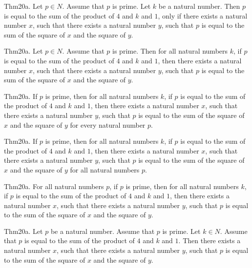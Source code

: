 \documentclass{article}
\begin{document}
Thm20a. Let $p \in N$. Assume that $p$ is prime. Let $k$ be a natural number. Then $p$ is equal to the sum of the product of $4$ and $k$ and $1$, only if there exists a natural number $x$, such that there exists a natural number $y$, such that $p$ is equal to the sum of the square of $x$ and the square of $y$.

Thm20a. Let $p \in N$. Assume that $p$ is prime. Then for all natural numbers $k$, if $p$ is equal to the sum of the product of $4$ and $k$ and $1$, then there exists a natural number $x$, such that there exists a natural number $y$, such that $p$ is equal to the sum of the square of $x$ and the square of $y$.

Thm20a. If $p$ is prime, then for all natural numbers $k$, if $p$ is equal to the sum of the product of $4$ and $k$ and $1$, then there exists a natural number $x$, such that there exists a natural number $y$, such that $p$ is equal to the sum of the square of $x$ and the square of $y$ for every natural number $p$.

Thm20a. If $p$ is prime, then for all natural numbers $k$, if $p$ is equal to the sum of the product of $4$ and $k$ and $1$, then there exists a natural number $x$, such that there exists a natural number $y$, such that $p$ is equal to the sum of the square of $x$ and the square of $y$ for all natural numbers $p$.

Thm20a. For all natural numbers $p$, if $p$ is prime, then for all natural numbers $k$, if $p$ is equal to the sum of the product of $4$ and $k$ and $1$, then there exists a natural number $x$, such that there exists a natural number $y$, such that $p$ is equal to the sum of the square of $x$ and the square of $y$.

Thm20a. Let $p$ be a natural number. Assume that $p$ is prime. Let $k \in N$. Assume that $p$ is equal to the sum of the product of $4$ and $k$ and $1$. Then there exists a natural number $x$, such that there exists a natural number $y$, such that $p$ is equal to the sum of the square of $x$ and the square of $y$.
\end{document}
